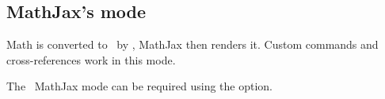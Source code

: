\begin{texsource}
\fixmathjaxtoc\int
\end{texsource}



\subsection{MathJax's \mathml{} mode}

Math is converted to \mathml\ by \texfourht, MathJax then renders it. Custom
commands and cross-references work in this mode.

The \mathml\ MathJax mode can be required using the  option.


